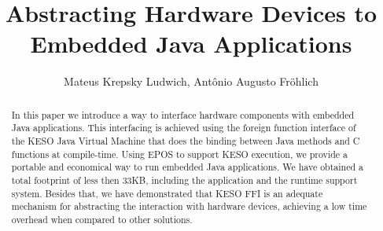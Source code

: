 \documentclass[12pt]{article} %
\title{Abstracting Hardware Devices to Embedded Java Applications}
\author{Mateus Krepsky Ludwich\inst{1}, Antônio Augusto Fröhlich\inst{1}}
\begin{document}
\maketitle

\begin{abstract}
% 
% 
In this paper we introduce a way to interface hardware components with embedded Java applications. This interfacing is achieved using the foreign function interface of the KESO Java Virtual Machine that does the binding between Java methods and C functions at compile-time. Using EPOS to support KESO execution, we provide a portable and economical way to run embedded Java applications. We have obtained a total footprint of less then 33KB, including the application and the runtime support system. Besides that, we have demonstrated that KESO FFI is an adequate mechanism for abstracting the interaction with hardware devices, achieving a low time overhead when compared to other solutions.

\end{abstract}

%
% 
\end{document}

